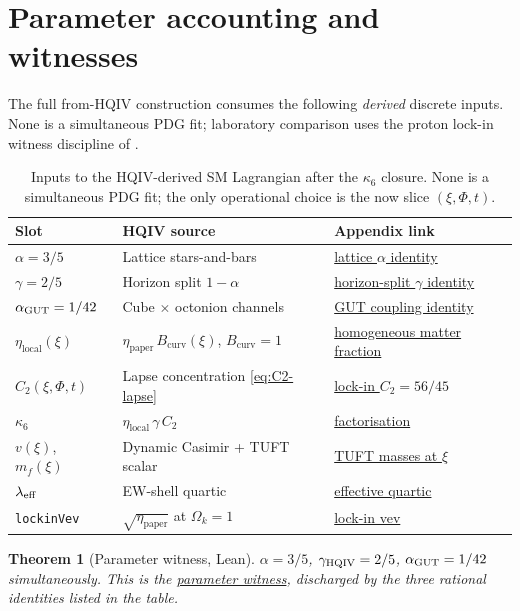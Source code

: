 \documentclass[11pt]{amsart}
\newtheorem{theorem}{Theorem}[section]
\begin{document}
\section{Parameter accounting and witnesses}
\label{sec:parameters}

The full from-HQIV construction consumes the following \emph{derived}
discrete inputs. None is a simultaneous PDG fit; laboratory comparison uses
the proton lock-in witness discipline of
\cite{hqiv-tuft-dynamic-mass-spectrum-paper,hqiv-kirchhoff-paper}.

\begin{table}[ht]
\caption{Inputs to the HQIV-derived SM Lagrangian after the $\kappa_6$
closure. None is a simultaneous PDG fit; the only operational choice is the
now slice $(\xi,\Phi,t)$.}
\label{tab:SM-parameters}
\centering
\footnotesize
\begin{tabular}{@{}p{3.6cm}p{5.2cm}p{4.6cm}@{}}
\toprule
Slot & HQIV source & Appendix link \\
\midrule
$\alpha=3/5$ & Lattice stars-and-bars &
  \hyperref[lean:alpha-35]{lattice $\alpha$ identity} \\
$\gamma=2/5$ & Horizon split $1-\alpha$ &
  \hyperref[lean:gamma-25]{horizon-split $\gamma$ identity} \\
$\alpha_{\rm GUT}=1/42$ & Cube $\times$ octonion channels &
  \hyperref[lean:alpha-gut]{GUT coupling identity} \\
$\eta_{\mathrm{local}}(\xi)$ & $\eta_{\mathrm{paper}}\,B_{\mathrm{curv}}(\xi)$, $B_{\mathrm{curv}}=1$ &
  \hyperref[lean:eta-local-shell]{homogeneous matter fraction} \\
$C_2(\xi,\Phi,t)$ & Lapse concentration \eqref{eq:C2-lapse} &
  \hyperref[lean:C2-lockin]{lock-in $C_2=56/45$} \\
$\kappa_6$ & $\eta_{\mathrm{local}}\,\gamma\,C_2$ &
  \hyperref[lean:kappa6-factorisation]{factorisation} \\
$v(\xi)$, $m_f(\xi)$ & Dynamic Casimir + TUFT scalar &
  \hyperref[lean:tuft-lepton-mass]{TUFT masses at $\xi$} \\
$\lambda_{\rm eff}$ & EW-shell quartic &
  \hyperref[lean:lambda-eff]{effective quartic} \\
\texttt{lockinVev} & $\sqrt{\eta_{\mathrm{paper}}}$ at $\Omega_k=1$ &
  \hyperref[lean:lockin-vev]{lock-in vev} \\
\bottomrule
\end{tabular}
\end{table}

\begin{theorem}[Parameter witness, Lean]
\label{thm:param-witness}
$\alpha=3/5$, $\gamma_{\rm HQIV}=2/5$, $\alpha_{\rm GUT}=1/42$
simultaneously. This is the \hyperref[lean:param-witness]{parameter witness},
discharged by the three rational identities listed in the table.
\end{theorem}
\end{document}

